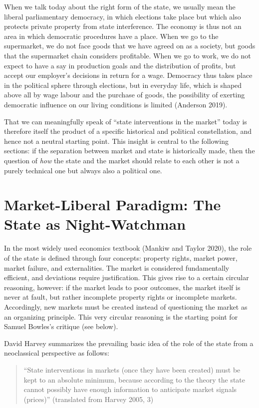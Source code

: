 \documentclass[
  british,
  a4paper,
  DIV=11,
  numbers=noendperiod,
  oneside,
  openany]{scrreprt}
\begin{document}
When we talk today about the right form of the state, we usually mean
the liberal parliamentary democracy, in which elections take place but
which also protects private property from state interference. The
economy is thus not an area in which democratic procedures have a place.
When we go to the supermarket, we do not face goods that we have agreed
on as a society, but goods that the supermarket chain considers
profitable. When we go to work, we do not expect to have a say in
production goals and the distribution of profits, but accept our
employer's decisions in return for a wage. Democracy thus takes place in
the political sphere through elections, but in everyday life, which is
shaped above all by wage labour and the purchase of goods, the
possibility of exerting democratic influence on our living conditions is
limited (Anderson 2019).

That we can meaningfully speak of ``state interventions in the market''
today is therefore itself the product of a specific historical and
political constellation, and hence not a neutral starting point. This
insight is central to the following sections: if the separation between
market and state is historically made, then the question of \emph{how}
the state and the market should relate to each other is not a purely
technical one but always also a political one.

\section{Market-Liberal Paradigm: The State as
Night-Watchman}\label{market-liberal-paradigm-the-state-as-night-watchman}

In the most widely used economics textbook (Mankiw and Taylor 2020), the
role of the state is defined through four concepts: property rights,
market power, market failure, and externalities. The market is
considered fundamentally efficient, and deviations require
justification. This gives rise to a certain circular reasoning, however:
if the market leads to poor outcomes, the market itself is never at
fault, but rather incomplete property rights or incomplete markets.
Accordingly, new markets must be created instead of questioning the
market as an organizing principle. This very circular reasoning is the
starting point for Samuel Bowles's critique (see below).

David Harvey summarizes the prevailing basic idea of the role of the
state from a neoclassical perspective as follows:

\begin{quote}
``State interventions in markets (once they have been created) must be
kept to an absolute minimum, because according to the theory the state
cannot possibly have enough information to anticipate market signals
(prices)'' (translated from Harvey 2005, 3)
\end{quote}
\end{document}
